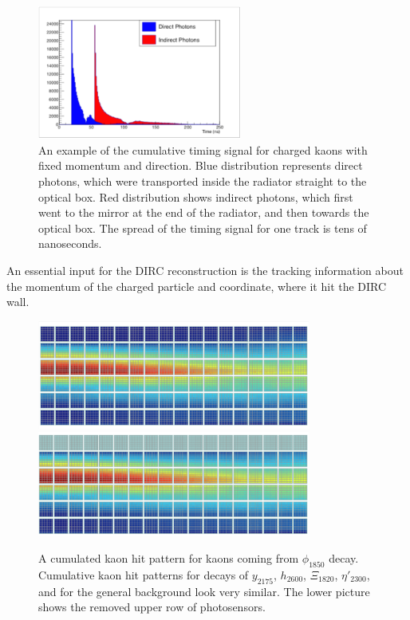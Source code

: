 \documentclass[11pt, a4paper]{article}
\begin{document}
\begin{figure}[h]
\centering
\includegraphics[angle=0,width=0.6\textwidth]{pics/time.pdf}
\caption{\label{pic:time}
An example of the cumulative timing signal for charged kaons with fixed momentum and direction. Blue distribution represents direct photons, which were transported inside the radiator straight to the optical box. Red distribution shows indirect photons, which first went to the mirror at the end of the radiator, and then towards the optical box. The spread of the timing signal for one track is tens of nanoseconds.
}
\end{figure}

An essential input for the DIRC reconstruction is the tracking information about the momentum of the charged particle and coordinate, where it hit the DIRC wall.

\begin{figure}[!h]
\centering
\includegraphics[angle=0,width=0.8\textwidth]{pics/phi1850.png}\\
\includegraphics[width=0.8\textwidth]{pics/5rowsHP.png}
\caption{\label{pic:phi}
A cumulated kaon hit pattern for kaons coming from $\phi_{1850}$ decay. Cumulative kaon hit patterns for decays of $y_{2175}$, $h_{2600}$, $\Xi_{1820}$, $\eta'_{2300}$, and for the general background look very similar. The lower picture shows the removed upper row of photosensors. 
}
\end{figure}
\end{document}
